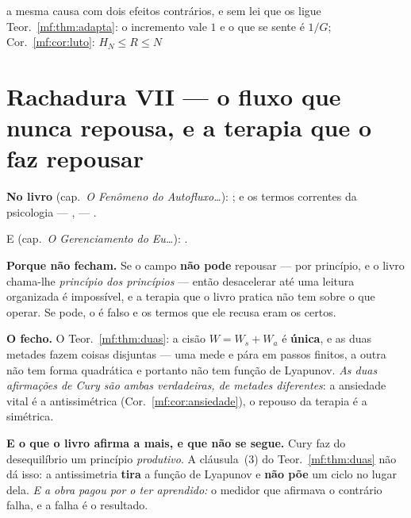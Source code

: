 \documentclass[../livro.tex]{subfiles}
\begin{document}
      {a mesma causa com dois efeitos contrários, e sem lei que os ligue}
      {Teor.~\ref{mf:thm:adapta}: o incremento vale $1$ e o que se sente é
       $1/G$; Cor.~\ref{mf:cor:luto}: $H_N\le R\le N$}

\section{Rachadura VII --- o fluxo que nunca repousa, e a terapia que o faz repousar}\label{mf:r7}

\noindent\textbf{No livro} (cap.~\emph{O Fenômeno do Autofluxo\dots}): ; e os termos correntes da psicologia ---
,  --- .

\noindent E (cap.~\emph{O Gerenciamento do Eu\dots}): .

\medskip\noindent\textbf{Porque não fecham.} Se o campo \textbf{não pode}
repousar --- por princípio, e o livro chama-lhe \emph{princípio dos princípios}
--- então desacelerar até uma leitura organizada é impossível, e a terapia que o
livro pratica não tem sobre o que operar. Se pode, o  é falso e os
termos que ele recusa eram os certos.

\medskip\noindent\textbf{O fecho.} O Teor.~\ref{mf:thm:duas}: a cisão
$W=W_s+W_a$ é \textbf{única}, e as duas metades fazem coisas disjuntas --- uma
mede e pára em passos finitos, a outra não tem forma quadrática e portanto não
tem função de Lyapunov. \emph{As duas afirmações de Cury são ambas verdadeiras,
de metades diferentes}: a ansiedade vital é a antissimétrica
(Cor.~\ref{mf:cor:ansiedade}), o repouso da terapia é a simétrica.

\medskip\noindent\textbf{E o que o livro afirma a mais, e que não se segue.} Cury
faz do desequilíbrio um princípio \emph{produtivo}. A cláusula~(3) do
Teor.~\ref{mf:thm:duas} não dá isso: a antissimetria \textbf{tira} a função de
Lyapunov e \textbf{não põe} um ciclo no lugar dela. \emph{E a obra pagou por o
ter aprendido:} o medidor que afirmava o contrário falha, e a falha é o resultado.
\end{document}
